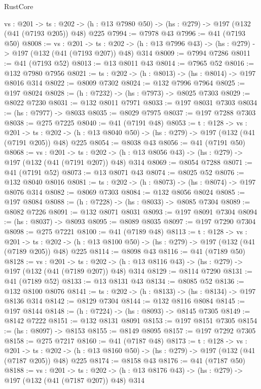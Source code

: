 \begin{lexlean}{RustCore}
\begin{coremodule}
  {vs : @201} ->
  {ts : @202} -> (h : @13 @7980 @50) -> (hs : @279) -> @197 (@132 (@41 (@7193 @205)) @48) @225
@7994 := @7978 @43
@7996 := @41 (@7193 @50)
@8008 := {vs : @201} ->
  {ts : @202} -> (h : @13 @7996 @43) -> (hs : @279) -> @197 (@132 (@41 (@7193 @207)) @48) @314
@8009 := @7994 @7286
@8011 := @41 (@7193 @52)
@8013 := @13 @8011 @43
@8014 := @7965 @52
@8016 := @132 @7980 @7956
@8021 := {ts : @202} -> (h : @8013) -> (hs : @8014) -> @197 @8016 @314
@8022 := @8009 @7302
@8024 := @132 @7996 @7964
@8025 := @197 @8024
@8028 := (h : @7232) -> (hs : @7973) -> @8025 @7303
@8029 := @8022 @7230
@8031 := @132 @8011 @7971
@8033 := @197 @8031 @7303
@8034 := (hs : @7977) -> @8033
@8035 := @8029 @7975
@8037 := @197 @7288 @7303
@8038 := @275 @7225
@8040 := @41 (@7191 @48)
@8053 := {t : @128} ->
  {vs : @201} ->
  {ts : @202} -> (h : @13 @8040 @50) -> (hs : @279) -> @197 (@132 (@41 (@7191 @205)) @48) @225
@8054 := @8038 @43
@8056 := @41 (@7191 @50)
@8068 := {vs : @201} ->
  {ts : @202} -> (h : @13 @8056 @43) -> (hs : @279) -> @197 (@132 (@41 (@7191 @207)) @48) @314
@8069 := @8054 @7288
@8071 := @41 (@7191 @52)
@8073 := @13 @8071 @43
@8074 := @8025 @52
@8076 := @132 @8040 @8016
@8081 := {ts : @202} -> (h : @8073) -> (hs : @8074) -> @197 @8076 @314
@8082 := @8069 @7303
@8084 := @132 @8056 @8024
@8085 := @197 @8084
@8088 := (h : @7228) -> (hs : @8033) -> @8085 @7304
@8089 := @8082 @7226
@8091 := @132 @8071 @8031
@8093 := @197 @8091 @7304
@8094 := (hs : @8037) -> @8093
@8095 := @8089 @8035
@8097 := @197 @7290 @7304
@8098 := @275 @7221
@8100 := @41 (@7189 @48)
@8113 := {t : @128} ->
  {vs : @201} ->
  {ts : @202} -> (h : @13 @8100 @50) -> (hs : @279) -> @197 (@132 (@41 (@7189 @205)) @48) @225
@8114 := @8098 @43
@8116 := @41 (@7189 @50)
@8128 := {vs : @201} ->
  {ts : @202} -> (h : @13 @8116 @43) -> (hs : @279) -> @197 (@132 (@41 (@7189 @207)) @48) @314
@8129 := @8114 @7290
@8131 := @41 (@7189 @52)
@8133 := @13 @8131 @43
@8134 := @8085 @52
@8136 := @132 @8100 @8076
@8141 := {ts : @202} -> (h : @8133) -> (hs : @8134) -> @197 @8136 @314
@8142 := @8129 @7304
@8144 := @132 @8116 @8084
@8145 := @197 @8144
@8148 := (h : @7224) -> (hs : @8093) -> @8145 @7305
@8149 := @8142 @7222
@8151 := @132 @8131 @8091
@8153 := @197 @8151 @7305
@8154 := (hs : @8097) -> @8153
@8155 := @8149 @8095
@8157 := @197 @7292 @7305
@8158 := @275 @7217
@8160 := @41 (@7187 @48)
@8173 := {t : @128} ->
  {vs : @201} ->
  {ts : @202} -> (h : @13 @8160 @50) -> (hs : @279) -> @197 (@132 (@41 (@7187 @205)) @48) @225
@8174 := @8158 @43
@8176 := @41 (@7187 @50)
@8188 := {vs : @201} ->
  {ts : @202} -> (h : @13 @8176 @43) -> (hs : @279) -> @197 (@132 (@41 (@7187 @207)) @48) @314

\end{coremodule}
\end{lexlean}
